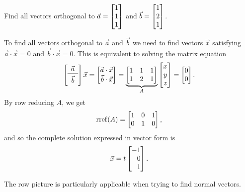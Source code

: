 \begin{example}
	Find all vectors orthogonal to $\vec a=\mat{1\\1\\1}$ and $\vec b=\mat{1\\2\\1}$.

	To find all vectors orthogonal to $\vec a$ and $\vec b$ we need to find vectors $\vec x$
	satisfying $\vec a\cdot \vec x=0$ and $\vec b\cdot \vec x=0$. This is equivalent to solving the matrix equation
	\[
		\left[\begin{array}{c}\vec a\\\hline\\[-1.5\medskipamount]\vec b\end{array}\right]\vec x
	=\mat{\vec a\cdot \vec x\\\vec b\cdot\vec x}
	=\underbrace{\mat{1&1&1\\1&2&1}}_A\mat{x\\y\\z}
	=\mat{0\\0}.
    \]
    By row reducing $A$, we get
    \[
        \Rref(A) = \mat{1&0&1\\0&1&0},
    \]
    and so the complete solution expressed in vector form is
    \[
        \vec x = t\mat{-1\\0\\1}.
    \]
\end{example}

The row picture is particularly applicable when trying to find normal vectors.

